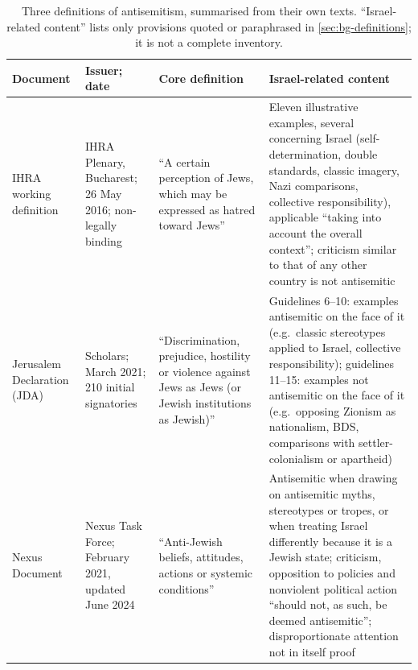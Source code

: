 \begin{table}[tbp]
\centering
\caption{Three definitions of antisemitism, summarised from their own texts. ``Israel-related content'' lists only provisions quoted or paraphrased in \cref{sec:bg-definitions}; it is not a complete inventory.}\label{tab:bg-definitions}
\footnotesize
\setlength{\tabcolsep}{4pt}
\renewcommand{\arraystretch}{1.15}
\begin{tabularx}{\textwidth}{@{}>{\raggedright\arraybackslash}p{2.0cm}>{\raggedright\arraybackslash}p{2.6cm}>{\raggedright\arraybackslash}X>{\raggedright\arraybackslash}X@{}}
\toprule
Document & Issuer; date & Core definition & Israel-related content \\
\midrule
IHRA working definition & IHRA Plenary, Bucharest; 26 May 2016; non-legally binding & ``A certain perception of Jews, which may be expressed as hatred toward Jews'' & Eleven illustrative examples, several concerning Israel (self-determination, double standards, classic imagery, Nazi comparisons, collective responsibility), applicable ``taking into account the overall context''; criticism similar to that of any other country is not antisemitic \\
\addlinespace
Jerusalem Declaration (JDA) & Scholars; March 2021; 210 initial signatories & ``Discrimination, prejudice, hostility or violence against Jews as Jews (or Jewish institutions as Jewish)'' & Guidelines 6--10: examples antisemitic on the face of it (e.g.\ classic stereotypes applied to Israel, collective responsibility); guidelines 11--15: examples not antisemitic on the face of it (e.g.\ opposing Zionism as nationalism, BDS, comparisons with settler-colonialism or apartheid) \\
\addlinespace
Nexus Document & Nexus Task Force; February 2021, updated June 2024 & ``Anti-Jewish beliefs, attitudes, actions or systemic conditions'' & Antisemitic when drawing on antisemitic myths, stereotypes or tropes, or when treating Israel differently because it is a Jewish state; criticism, opposition to policies and nonviolent political action ``should not, as such, be deemed antisemitic''; disproportionate attention not in itself proof \\
\bottomrule
\end{tabularx}
\end{table}

